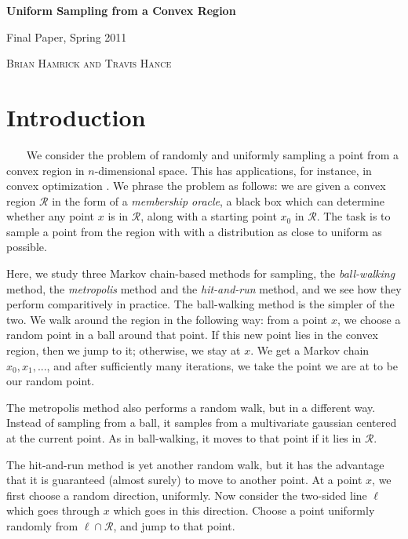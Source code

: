 \documentclass[11pt]{article}
\begin{document}
\begin{center} \begin{LARGE} {\sc \bf Uniform Sampling from a Convex Region} \vspace{6pt}

{ Final Paper, Spring 2011} \vspace{9pt}

\end{LARGE} { \Large \textsc{Brian Hamrick and Travis Hance}}

\end{center}

\section{Introduction}

~~~ We consider the problem of randomly and uniformly sampling a point from a convex region in $n$-dimensional space. This has applications, for instance, in convex optimization \cite{Dabbene}. We phrase the problem as follows: we are given a convex region $\mathcal{R}$ in the form of a \emph{membership oracle}, a black box which can determine whether any point $x$ is in $\mathcal{R}$, along with a starting point $x_0$ in $\mathcal{R}$. The task is to sample a point from the region with with a distribution as close to uniform as possible.

Here, we study three Markov chain-based methods for sampling, the \emph{ball-walking} method, the \emph{metropolis} method and the \emph{hit-and-run} method, and we see how they perform comparitively in practice. The ball-walking method is the simpler of the two. We walk around the region in the following way: from a point $x$, we choose a random point in a ball around that point. If this new point lies in the convex region, then we jump to it; otherwise, we stay at $x$. We get a Markov chain $x_0, x_1, ...$, and after sufficiently many iterations, we take the point we are at to be our random point.

The metropolis method also performs a random walk, but in a different way. Instead of sampling from a ball, it samples from a multivariate gaussian centered at the current point. As in ball-walking, it moves to that point if it lies in $\mathcal{R}$.

The hit-and-run method is yet another random walk, but it has the advantage that it is guaranteed (almost surely) to move to another point. At a point $x$, we first choose a random direction, uniformly. Now consider the two-sided line $\ell$ which goes through $x$ which goes in this direction. Choose a point uniformly randomly from $\ell\cap\mathcal{R}$, and jump to that point.
\end{document}
